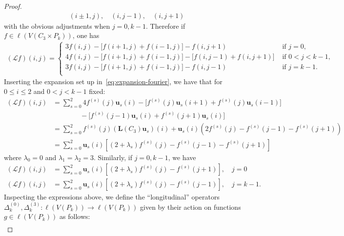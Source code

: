 \documentclass[10pt,a4paper]{amsart}
\begin{document}
\begin{proof}
        \begin{align*}
            (i\pm 1,j),\quad (i,j-1),\quad (i,j+1)
        \end{align*}
    with the obvious adjustments when $j = 0, k-1$. Therefore if $f\in \ell(V(C_3\times P_k))$, one has
        {\footnotesize\begin{align*}
            (\mathcal L f)(i,j)= \begin{cases}
                3f(i,j)-\bigl[f(i+1,j)+f(i-1,j)\bigr] - f(i,j+1) &\text{ if } j = 0,\\
                4f(i,j)-\bigl[f(i+1,j)+f(i-1,j)\bigr] -\bigl[f(i,j-1)+f(i,j+1)\bigr] &\text{ if } 0 < j < k-1,\\
                3f(i,j)-\bigl[f(i+1,j)+f(i-1,j)\bigr] - f(i,j-1) &\text{ if } j = k-1.\\
            \end{cases}
        \end{align*}}
    Inserting the expansion set up in~\cref{eq:expansion-fourier}, we have that for $0\leq i\leq 2$ and $0 < j < k-1$ fixed:
        \begin{align*}
            (\mathcal{L}f)(i, j) &= \sum_{s=0}^2 4f^{(s)}(j)\mathbf{u}_s(i)-\bigl[  f^{(s)}(j)\mathbf{u}_s(i+1) + f^{(s)}(j)\mathbf{u}_s(i-1) \bigr]\\
            &\qquad\qquad-\bigl[ f^{(s)}(j-1)\mathbf{u}_s(i) +f^{(s)}(j+1)\mathbf{u}_s(i)\bigr]\\
            &= \sum_{s=0}^2 f^{(s)}(j)(\mathbf{L}(C_3)\mathbf{u}_s)(i) + \mathbf{u}_s(i)(2f^{(s)}(j) -f^{(s)}(j-1) -f^{(s)}(j+1)) \\
            &=\sum_{s=0}^2 \mathbf{u}_s(i)\left[(2+\lambda_s)f^{(s)}(j) -f^{(s)}(j-1) -f^{(s)}(j+1)\right]
        \end{align*}
    where $\lambda_0 = 0$ and $\lambda_1 = \lambda_2= 3$. Similarly, if $j=0, k-1$, we have
        \begin{align*}
            (\mathcal{L}f)(i, j) &= \sum_{s=0}^2 \mathbf{u}_s(i)\left[(2+\lambda_s)f^{(s)}(j) -f^{(s)}(j+1)\right],\quad j=0\\
            (\mathcal{L}f)(i, j) &= \sum_{s=0}^2 \mathbf{u}_s(i)\left[(2+\lambda_s)f^{(s)}(j) -f^{(s)}(j-1)\right],\quad j=k-1.
        \end{align*}
    Inspecting the expressions above, we define the ``longitudinal'' operators $\Delta_k^{(0)}, \Delta_k^{(3)}:\ell(V(P_k))\rightarrow \ell(V(P_k))$ given by their action on functions $g\in \ell(V(P_k))$ as follows:
        \begin{align*}

\end{align*}
\end{proof}
\end{document}
